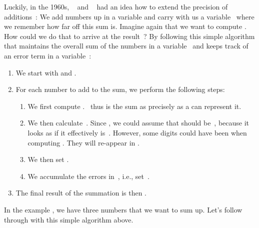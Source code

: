 Luckily, in the 1960s, \citeauthor{K1965PFRORTE}~\cite{K1965PFRORTE} and \citeauthor{B1968NSIMA}~\cite{B1968NSIMA} had an idea how to extend the precision of additions~\cite{G1991WECSSKAFPA,L2020RWECSSKAFPA}:
We add numbers up in a  variable and carry with us a variable~ where we remember how far off this sum is.
Imagine again that we want to compute .
How could we do that to arrive at the result~?
By following this simple algorithm that maintains the overall sum of the numbers in a variable~ and keeps track of an error term in a variable~:%
%
\begin{enumerate}%
%
\item We start with  and .%
%
\item For each number to add to the sum, we perform the following steps:%
\begin{enumerate}%
%
\item We first compute . %
~thus is the sum as precisely as a  can represent it.
%
\item We then calculate~. %
Since , we could assume that  should be~, because it looks as if it effectively is~. %
However, some digits could have been  when computing .
They will re-appear in .%
%
\item We then set .%
%
\item We accumulate the errors in~, i.e., set~.%
%
\end{enumerate}%
%
\item The final result of the summation is then .
\end{enumerate}%
%
In the example , we have three numbers that we want to sum up.
Let's follow through with this simple algorithm above.%
%
